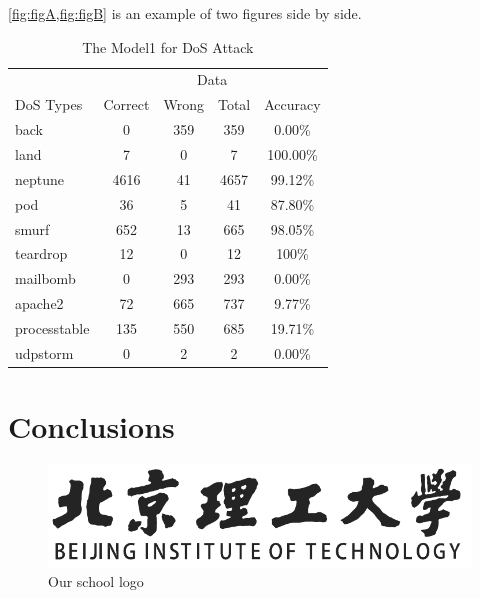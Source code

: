 \documentclass[12pt,english,openany,a4paper]{book}
\begin{document}
	\cref{fig:figA,fig:figB} is an example of two figures side by side.
	 
	\begin{table}[h]
		\centering
		\begin{tabular}{lcccc}
			\toprule
			& \multicolumn{4}{c}{Data} \\ \cmidrule(lr){2-5}
			DoS Types & Correct &  Wrong & Total & Accuracy \\
			\midrule
			back & 0 & 359 & 359 & 0.00\% \\
			land & 7 & 0 & 7 & 100.00\% \\
			neptune & 4616 & 41 & 4657 & 99.12\% \\
			pod & 36 & 5 & 41 & 87.80\% \\
			smurf & 652 & 13 & 665 & 98.05\% \\
			teardrop & 12 & 0 & 12 & 100\% \\
			mailbomb & 0 & 293 & 293 & 0.00\% \\
			apache2 & 72 & 665 & 737 & 9.77\% \\
			processtable & 135 & 550 & 685 & 19.71\% \\
			udpstorm & 0 & 2 & 2 & 0.00\% \\
			\bottomrule
		\end{tabular}
		\caption{The Model1 for DoS Attack}
		\label{tab-label}
	\end{table}
	\lipsum[6-9]
	
	\chapter{Conclusions}
	
	\lipsum[2]
	\begin{figure}[h]
		\centering
		\includegraphics[width=0.6\linewidth]{Figures/logo_slogan}
		\caption{Our school logo}
		\label{fig:logoslogan}
	\end{figure}
	
	
	\lipsum[3-5]
	
	\pagebreak
	
	\renewcommand{\bibname}{References}
	
	
	
\end{document}
